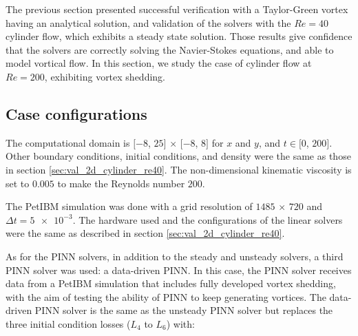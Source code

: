 
The previous section presented successful verification with a Taylor-Green vortex having an analytical solution, and validation of the solvers with the $Re=40$ cylinder flow, which exhibits a steady state solution.
Those results give confidence that the solvers are correctly solving the Navier-Stokes equations, and able to model vortical flow. In this section, we study the case of cylinder flow at $Re=200$, exhibiting vortex shedding.

\subsection{Case configurations}

The computational domain is $[-8$, $25]$ $\times$ $[-8$, $8]$ for $x$ and $y$, and $t\in[0$, $200]$.
Other boundary conditions, initial conditions, and density were the same as those in section \ref{sec:val_2d_cylinder_re40}.
The non-dimensional kinematic viscosity is set to $0.005$ to make the Reynolds number $200$.

The PetIBM simulation was done with a grid resolution of $1485$ $\times$ $720$ and $\Delta t = \num{5e-3}$.
The hardware used and the configurations of the linear solvers were the same as described in section \ref{sec:val_2d_cylinder_re40}.

As for the PINN solvers, in addition to the steady and unsteady solvers, a third PINN solver was used: a data-driven PINN.
In this case, the PINN solver receives data from a PetIBM simulation that includes fully developed vortex shedding, with the aim of testing the ability of PINN to keep generating vortices.
The data-driven PINN solver is the same as the unsteady PINN solver but replaces the three initial condition losses ($L_4$ to $L_6$) with:

